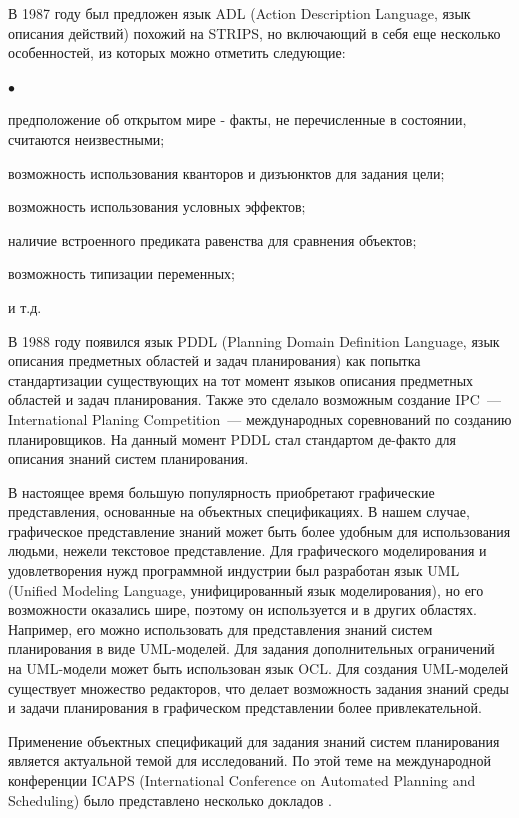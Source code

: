 \documentclass[a4paper,14pt]{extreport}
\newenvironment{compactlist}{
    \begin{list}
    {{$\bullet$}}
    {
        \setlength\partopsep{0pt}
        \setlength\parskip{0pt}
        \setlength\parsep{0pt}
        \setlength\topsep{0pt}
        \setlength\itemsep{0pt}                        
    }
}{
    \end{list}
}
\begin{document}
	В 1987 году был предложен язык ADL (Action Description Language, язык описания действий) похожий на STRIPS, но включающий в себя еще несколько особенностей, из которых можно отметить следующие:
	\begin{compactlist}
	    \item предположение об открытом мире - факты, не перечисленные в состоянии, считаются неизвестными;
	    \item возможность использования кванторов и дизъюнктов для задания цели;
	    \item возможность использования условных эффектов;
	    \item наличие встроенного предиката равенства для сравнения объектов;
	    \item возможность типизации переменных;
	    \item и т.д.
	\end{compactlist}
    
    В 1988 году появился язык PDDL\cite{pddl3} (Planning Domain Definition Language, язык описания предметных областей и задач планирования) как попытка стандартизации существующих на тот момент языков описания предметных областей и задач планирования.
 Также это сделало возможным создание IPC~--- International Planing Competition~--- международных соревнований по созданию планировщиков.
 На данный момент PDDL стал стандартом де-факто для описания знаний систем планирования.
  
    В настоящее время большую популярность приобретают графические представления, основанные на объектных спецификациях.
 В нашем случае, графическое представление знаний может быть более удобным для использования людьми, нежели текстовое представление.
 Для графического моделирования и удовлетворения нужд программной индустрии был разработан язык UML\cite{rambo-uml2} (Unified Modeling Language, унифицированный язык моделирования), но его возможности оказались шире, поэтому он используется и в других областях.
 Например, его можно использовать для представления знаний систем планирования в виде UML-моделей.
 Для задания дополнительных ограничений на UML-модели может быть использован язык OCL\cite{ocl}.
 Для создания UML-моделей существует множество редакторов, что делает возможность задания знаний среды и задачи планирования в графическом представлении более привлекательной.
     
    Применение объектных спецификаций для задания знаний систем планирования является актуальной темой для исследований.
  По этой теме на международной конференции ICAPS (International Conference on Automated Planning and Scheduling) было представлено несколько докладов \cite{icaps-1, icaps-2}.
\end{document}
